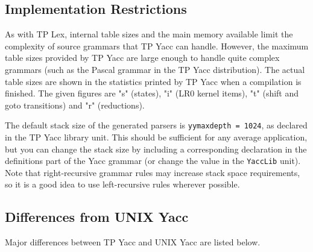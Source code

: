 \subsection{Implementation Restrictions}

As with TP Lex, internal table sizes and the main memory available limit the
complexity of source grammars that TP Yacc can handle. However, the maximum
table sizes provided by TP Yacc are large enough to handle quite complex
grammars (such as the Pascal grammar in the TP Yacc distribution). The actual
table sizes are shown in the statistics printed by TP Yacc when a compilation
is finished. The given figures are "s" (states), "i" (LR0 kernel items), "t"
(shift and goto transitions) and "r" (reductions).

The default stack size of the generated parsers is \verb"yymaxdepth = 1024",
as declared in the TP Yacc library unit. This should be sufficient for any
average application, but you can change the stack size by including a
corresponding declaration in the definitions part of the Yacc grammar
(or change the value in the \verb"YaccLib" unit). Note that right-recursive
grammar rules may increase stack space requirements, so it is a good
idea to use left-recursive rules wherever possible.

\subsection{Differences from UNIX Yacc}

Major differences between TP Yacc and UNIX Yacc are listed below.

